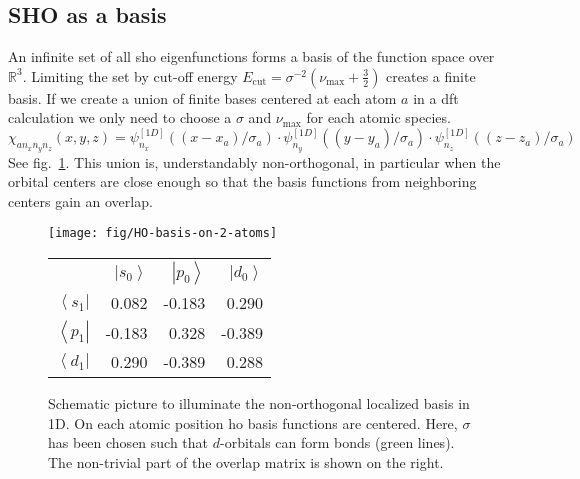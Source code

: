 \documentclass[oribibl]{llncs}
\newcommand{\um}[1]{_{\mathrm{#1}}}
\newcommand{\ket}[1]{\left| #1 \right\rangle}
\newcommand{\bra}[1]{\left\langle #1 \right|}
\begin{document}
\subsection{SHO as a basis}
An infinite set of all \ac{sho} eigenfunctions forms a basis of the function space over $\mathbb R^3$.
Limiting the set by cut-off energy $E\um{cut} = \sigma^{-2} (\nu\um{max} + \frac 32)$
creates a finite basis.
If we create a union of finite bases centered at each atom $a$ in a \ac{dft} calculation 
we only need to choose a $\sigma$ and $\nu\um{max}$ for each atomic species.
\begin{equation}
  \chi_{a n_x n_y n_z}(x,y,z) = \psi^{[1D]}_{n_x}((x - x_a)/\sigma_a) 
                          \cdot \psi^{[1D]}_{n_y}((y - y_a)/\sigma_a) 
                          \cdot \psi^{[1D]}_{n_z}((z - z_a)/\sigma_a)
  \label{eqn:localized-basis}
\end{equation}
See fig.~\ref{fig:HO-basis-on-2-atoms}.
This union is, understandably non-orthogonal, in particular when the orbital centers
are close enough so that the basis functions from neighboring centers gain an overlap.
%
\begin{figure}
  \begin{minipage}[c]{.58\textwidth}
	\texttt{[image: fig/HO-basis-on-2-atoms]} %
  \end{minipage}\hfill
  \begin{minipage}[c]{.41\textwidth}
  

		\begin{tabular}{r rrr}
		\toprule
				    & $\ket{s_0}$ & $\ket{p_0}$ & $\ket{d_0}$ \\
				$\bra{s_1}$  &      0.082 &  -0.183 &  0.290  \\
				$\bra{p_1}$  &     -0.183 &   0.328 & -0.389  \\
				$\bra{d_1}$  &      0.290 &  -0.389 &  0.288  \\
		\bottomrule
		\end{tabular}

  \end{minipage}
  \label{fig:HO-basis-on-2-atoms}
  \caption{
Schematic picture to illuminate the non-orthogonal localized basis in 1D.
On each atomic position \ac{ho} basis functions are centered.
Here, $\sigma$ has been chosen such that $d$-orbitals can form bonds (green lines).
The non-trivial part of the overlap matrix is shown on the right.
  }
\end{figure}
%
%
\end{document}
